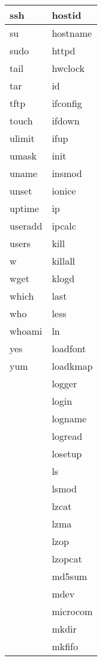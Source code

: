 \begin{longtable}{p{100mm}p{100mm}}
     \hline
     ssh & hostid \\
     \hline
     su & hostname \\
     \hline
     sudo & httpd \\
     \hline
     tail & hwclock \\
     \hline
     tar & id \\
     \hline
     tftp & ifconfig \\
     \hline
     touch & ifdown \\
     \hline
     ulimit & ifup \\
     \hline
     umask & init \\
     \hline
     uname & insmod \\
     \hline
     unset & ionice \\
     \hline
     uptime & ip \\
     \hline
     useradd & ipcalc \\
     \hline
     users & kill \\
     \hline
     w & killall \\
     \hline
     wget & klogd \\
     \hline
     which & last \\
     \hline
     who & less \\
     \hline
     whoami & ln \\
     \hline
     yes & loadfont \\
     \hline
     yum & loadkmap \\
     \hline
      & logger \\
     \hline
      & login \\
     \hline
      & logname \\
     \hline
      & logread \\
     \hline
      & losetup \\
     \hline
      & ls \\
     \hline
      & lsmod \\
     \hline
      & lzcat \\
     \hline
      & lzma \\
     \hline
      & lzop \\
     \hline
      & lzopcat \\
     \hline
      & md5sum \\
     \hline
      & mdev \\
     \hline
      & microcom \\
     \hline
      & mkdir \\
     \hline
      & mkfifo \\

\end{longtable}
